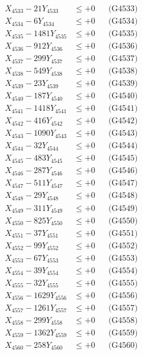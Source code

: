\documentclass[a4paper,10pt]{article}
\begin{document}
{\begin{align}
X_{4533} - 21Y_{4533} &\leq +0 && \text{(G4533)} \\
X_{4534} - 6Y_{4534} &\leq +0 && \text{(G4534)} \\
X_{4535} - 1481Y_{4535} &\leq +0 && \text{(G4535)} \\
X_{4536} - 912Y_{4536} &\leq +0 && \text{(G4536)} \\
X_{4537} - 299Y_{4537} &\leq +0 && \text{(G4537)} \\
X_{4538} - 549Y_{4538} &\leq +0 && \text{(G4538)} \\
X_{4539} - 23Y_{4539} &\leq +0 && \text{(G4539)} \\
X_{4540} - 187Y_{4540} &\leq +0 && \text{(G4540)} \\
\allowbreak
X_{4541} - 1418Y_{4541} &\leq +0 && \text{(G4541)} \\
X_{4542} - 416Y_{4542} &\leq +0 && \text{(G4542)} \\
X_{4543} - 1090Y_{4543} &\leq +0 && \text{(G4543)} \\
X_{4544} - 32Y_{4544} &\leq +0 && \text{(G4544)} \\
X_{4545} - 483Y_{4545} &\leq +0 && \text{(G4545)} \\
X_{4546} - 287Y_{4546} &\leq +0 && \text{(G4546)} \\
X_{4547} - 511Y_{4547} &\leq +0 && \text{(G4547)} \\
X_{4548} - 29Y_{4548} &\leq +0 && \text{(G4548)} \\
X_{4549} - 311Y_{4549} &\leq +0 && \text{(G4549)} \\
X_{4550} - 825Y_{4550} &\leq +0 && \text{(G4550)} \\
\allowbreak
X_{4551} - 37Y_{4551} &\leq +0 && \text{(G4551)} \\
X_{4552} - 99Y_{4552} &\leq +0 && \text{(G4552)} \\
X_{4553} - 67Y_{4553} &\leq +0 && \text{(G4553)} \\
X_{4554} - 39Y_{4554} &\leq +0 && \text{(G4554)} \\
X_{4555} - 32Y_{4555} &\leq +0 && \text{(G4555)} \\
X_{4556} - 1629Y_{4556} &\leq +0 && \text{(G4556)} \\
X_{4557} - 1261Y_{4557} &\leq +0 && \text{(G4557)} \\
X_{4558} - 299Y_{4558} &\leq +0 && \text{(G4558)} \\
X_{4559} - 1362Y_{4559} &\leq +0 && \text{(G4559)} \\
X_{4560} - 258Y_{4560} &\leq +0 && \text{(G4560)} \\

\end{align}}
\end{document}

